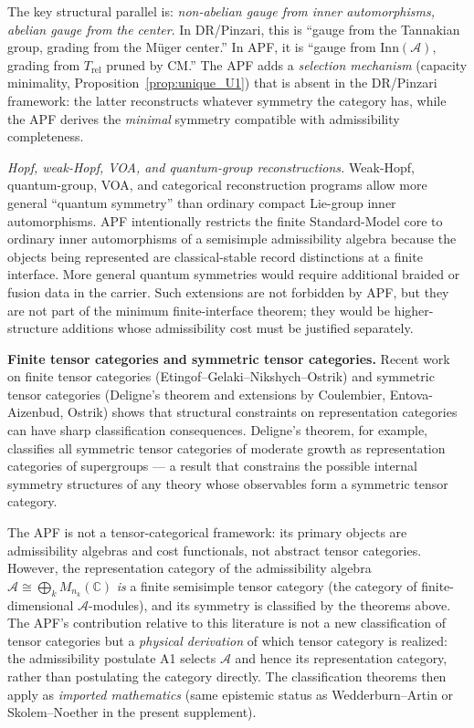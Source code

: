 \documentclass[11pt]{article}
\theoremstyle{definition}
\begin{document}
The key structural parallel is: \emph{non-abelian gauge from inner
automorphisms, abelian gauge from the center}.  In DR/Pinzari, this
is ``gauge from the Tannakian group, grading from the M\"uger center.''
In APF, it is ``gauge from $\mathrm{Inn}(\mathcal{A})$, grading from
$T_{\mathrm{rel}}$ pruned by CM.''  The APF adds a \emph{selection
mechanism} (capacity minimality, Proposition~\ref{prop:unique_U1})
that is absent in the DR/Pinzari framework: the latter reconstructs
whatever symmetry the category has, while the APF derives the
\emph{minimal} symmetry compatible with admissibility completeness.


\smallskip\noindent\textit{Hopf, weak-Hopf, VOA, and quantum-group reconstructions.}\quad
Weak-Hopf, quantum-group, VOA, and categorical reconstruction programs allow
more general ``quantum symmetry'' than ordinary compact Lie-group inner
automorphisms.  APF intentionally restricts the finite Standard-Model core to
ordinary inner automorphisms of a semisimple admissibility algebra because the
objects being represented are classical-stable record distinctions at a finite
interface.  More general quantum symmetries would require additional braided
or fusion data in the carrier.  Such extensions are not forbidden by APF, but
they are not part of the minimum finite-interface theorem; they would be
higher-structure additions whose admissibility cost must be justified separately.

\smallskip\noindent\textbf{Finite tensor categories and symmetric
tensor categories.}\quad
Recent work on finite tensor categories (Etingof--Gelaki--Nikshych--Ostrik)
and symmetric tensor categories (Deligne's theorem and extensions by
Coulembier, Entova-Aizenbud, Ostrik) shows that structural constraints
on representation categories can have sharp classification
consequences.  Deligne's theorem, for example, classifies all
symmetric tensor categories of moderate growth as representation
categories of supergroups --- a result that constrains the possible
internal symmetry structures of any theory whose observables form a
symmetric tensor category.

The APF is not a tensor-categorical framework: its primary objects are
admissibility algebras and cost functionals, not abstract tensor
categories.  However, the representation category of the admissibility
algebra $\mathcal{A} \cong \bigoplus_k M_{n_k}(\mathbb{C})$
\emph{is} a finite semisimple tensor category (the category of
finite-dimensional $\mathcal{A}$-modules), and its symmetry is
classified by the theorems above.  The APF's contribution relative to
this literature is not a new classification of tensor categories but a
\emph{physical derivation} of which tensor category is realized: the
admissibility postulate A1 selects $\mathcal{A}$ and hence its
representation category, rather than postulating the category
directly.  The classification theorems then apply as \emph{imported
mathematics} (same epistemic status as Wedderburn--Artin or
Skolem--Noether in the present supplement).
\end{document}
